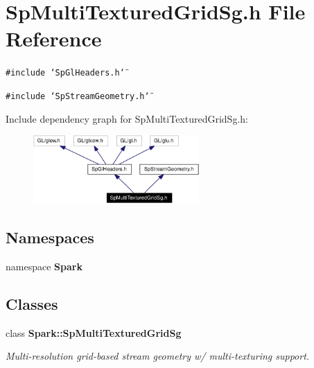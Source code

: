 \section{Sp\-Multi\-Textured\-Grid\-Sg.h File Reference}
\label{SpMultiTexturedGridSg_8h}
{\tt \#include \char`\"{}Sp\-Gl\-Headers.h\char`\"{}}\par
{\tt \#include \char`\"{}Sp\-Stream\-Geometry.h\char`\"{}}\par


Include dependency graph for Sp\-Multi\-Textured\-Grid\-Sg.h:\begin{figure}[H]
\begin{center}
\leavevmode
\includegraphics[width=179pt]{SpMultiTexturedGridSg_8h__incl}
\end{center}
\end{figure}
\subsection*{Namespaces}
\begin{CompactItemize}
\item 
namespace {\bf Spark}
\end{CompactItemize}
\subsection*{Classes}
\begin{CompactItemize}
\item 
class {\bf Spark::Sp\-Multi\-Textured\-Grid\-Sg}
\begin{CompactList}\small\item\em Multi-resolution grid-based stream geometry w/ multi-texturing support. \item\end{CompactList}\end{CompactItemize}
